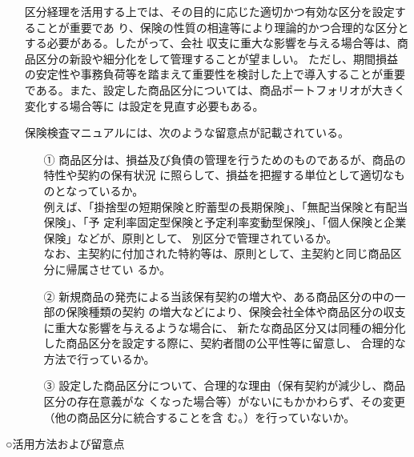 \documentclass[report,gutter=10mm,fore-edge=10mm,uplatex,dvipdfmx]{jlreq}
\begin{document}
\begin{itemize}
\item[] 区分経理を活用する上では、その目的に応じた適切かつ有効な区分を設定することが重要であ
 り、保険の性質の相違等により理論的かつ合理的な区分とする必要がある。したがって、会社
 収支に重大な影響を与える場合等は、商品区分の新設や細分化をして管理することが望ましい。
 ただし、期間損益の安定性や事務負荷等を踏まえて重要性を検討した上で導入することが重要
 である。また、設定した商品区分については、商品ポートフォリオが大きく変化する場合等に
 は設定を見直す必要もある。
\item[] 保険検査マニュアルには、次のような留意点が記載されている。
\begin{itemize}
\item[①] 商品区分は、損益及び負債の管理を行うためのものであるが、商品の特性や契約の保有状況
に照らして、損益を把握する単位として適切なものとなっているか。\\
 例えば、「掛捨型の短期保険と貯蓄型の長期保険」、「無配当保険と有配当保険」、「予
 定利率固定型保険と予定利率変動型保険」、「個人保険と企業保険」などが、原則として、
 別区分で管理されているか。\\
 なお、主契約に付加された特約等は、原則として、主契約と同じ商品区分に帰属させてい
 るか。
\item[②] 新規商品の発売による当該保有契約の増大や、ある商品区分の中の一部の保険種類の契約
 の増大などにより、保険会社全体や商品区分の収支に重大な影響を与えるような場合に、
 新たな商品区分又は同種の細分化した商品区分を設定する際に、契約者間の公平性等に留意し、
合理的な方法で行っているか。
\item[③] 設定した商品区分について、合理的な理由（保有契約が減少し、商品区分の存在意義がな
 くなった場合等）がないにもかかわらず、その変更（他の商品区分に統合することを含
 む。）を行っていないか。
\end{itemize}
\end{itemize}
\noindent ○活用方法および留意点
\end{document}
